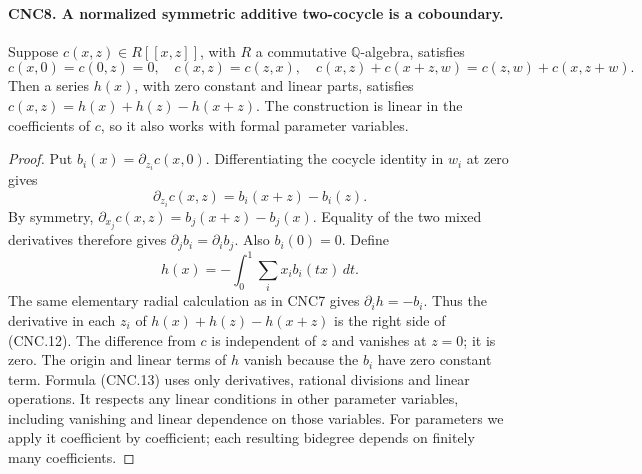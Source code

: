 \paragraph{CNC8. A normalized symmetric additive two-cocycle is a coboundary.}
\label{claim:CNC8}
Suppose \(c(x,z)\in R[[x,z]]\), with \(R\) a commutative
\(\mathbb Q\)-algebra, satisfies
\[
 c(x,0)=c(0,z)=0,\quad c(x,z)=c(z,x),\quad
 c(x,z)+c(x+z,w)=c(z,w)+c(x,z+w).
\]
Then a series \(h(x)\), with zero constant and linear parts, satisfies
\(c(x,z)=h(x)+h(z)-h(x+z)\).
The construction is linear in the coefficients of \(c\), so it also
works with formal parameter variables.
\begin{proof}
Put \(b_i(x)=\partial_{z_i}c(x,0)\).  Differentiating the cocycle
identity in \(w_i\) at zero gives
\[
 \partial_{z_i}c(x,z)=b_i(x+z)-b_i(z).                        \tag{CNC.12}
\]
By symmetry,
\(\partial_{x_j}c(x,z)=b_j(x+z)-b_j(x)\).
Equality of the two mixed derivatives therefore gives
\(\partial_jb_i=\partial_ib_j\).  Also \(b_i(0)=0\).
Define
\[
 h(x)=-\int_0^1\sum_i x_i b_i(tx)\,dt.                       \tag{CNC.13}
\]
The same elementary radial calculation as in CNC7 gives
\(\partial_i h=-b_i\).  Thus the derivative in each \(z_i\)
of \(h(x)+h(z)-h(x+z)\) is the right side of (CNC.12).
The difference from \(c\) is independent of \(z\) and vanishes
at \(z=0\); it is zero.  The origin and linear terms of \(h\)
vanish because the \(b_i\) have zero constant term.  Formula
(CNC.13) uses only derivatives, rational divisions and linear
operations.  It respects any linear conditions in other parameter
variables, including vanishing and linear dependence on those
variables.  For parameters we apply it coefficient by coefficient;
each resulting bidegree depends on finitely many coefficients.
\end{proof}

